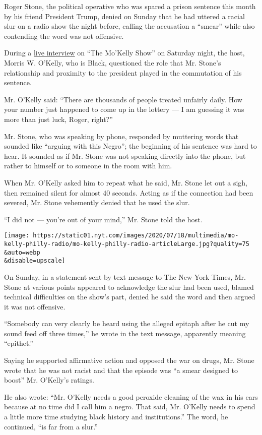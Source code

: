 Roger Stone, the political operative who was spared a prison sentence
this month by his friend President Trump, denied on Sunday that he had
uttered a racial slur on a radio show the night before, calling the
accusation a ``smear'' while also contending the word was not offensive.

During a
\href{https://www.spreaker.com/user/kfiam640/roger-stone-podcast-2020}{live
interview} on ``The Mo'Kelly Show'' on Saturday night, the host, Morris
W. O'Kelly, who is Black, questioned the role that Mr. Stone's
relationship and proximity to the president played in the commutation of
his sentence.

Mr. O'Kelly said: ``There are thousands of people treated unfairly
daily. How your number just happened to come up in the lottery --- I am
guessing it was more than just luck, Roger, right?''

Mr. Stone, who was speaking by phone, responded by muttering words that
sounded like ``arguing with this Negro''; the beginning of his sentence
was hard to hear. It sounded as if Mr. Stone was not speaking directly
into the phone, but rather to himself or to someone in the room with
him.

When Mr. O'Kelly asked him to repeat what he said, Mr. Stone let out a
sigh, then remained silent for almost 40 seconds. Acting as if the
connection had been severed, Mr. Stone vehemently denied that he used
the slur.

``I did not --- you're out of your mind,'' Mr. Stone told the host.

\texttt{[image: https://static01.nyt.com/images/2020/07/18/multimedia/mo-kelly-philly-radio/mo-kelly-philly-radio-articleLarge.jpg?quality=75\\\&auto=webp\\\&disable=upscale]}

On Sunday, in a statement sent by text message to The New York Times,
Mr. Stone at various points appeared to acknowledge the slur had been
used, blamed technical difficulties on the show's part, denied he said
the word and then argued it was not offensive.

``Somebody can very clearly be heard using the alleged epitaph after he
cut my sound feed off three times,'' he wrote in the text message,
apparently meaning ``epithet.''

Saying he supported affirmative action and opposed the war on drugs, Mr.
Stone wrote that he was not racist and that the episode was ``a smear
designed to boost'' Mr. O'Kelly's ratings.

He also wrote: ``Mr. O'Kelly needs a good peroxide cleaning of the wax
in his ears because at no time did I call him a negro. That said, Mr.
O'Kelly needs to spend a little more time studying black history and
institutions.'' The word, he continued, ``is far from a slur.''

